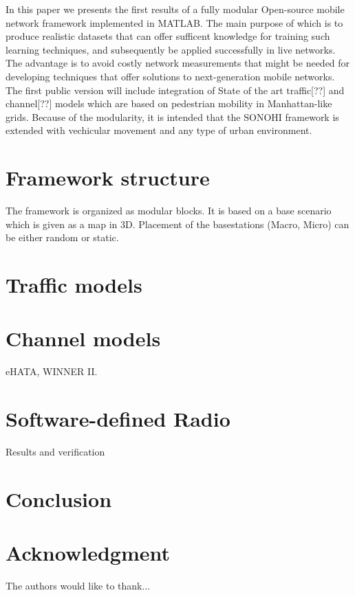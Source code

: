 \documentclass[conference]{IEEEtran}
\begin{document}
In this paper we presents the first results of a fully modular Open-source mobile network framework implemented in MATLAB. The main purpose of which is to produce realistic datasets that can offer sufficent knowledge for training such learning techniques, and subsequently be applied successfully in live networks. The advantage is to avoid costly network measurements that might be needed for developing techniques that offer solutions to next-generation mobile networks. The first public version will include integration of State of the art traffic[??] and channel[??] models which are based on pedestrian mobility in Manhattan-like grids.  Because of the modularity, it is intended that the SONOHI framework is extended with vechicular movement and any type of urban environment.

\section{Framework structure}
The framework is organized as modular blocks. It is based on a base scenario which is given as a map in 3D. Placement of the basestations (Macro, Micro) can be either random or static.

\section{Traffic models}

\section{Channel models}
eHATA, WINNER II.

\section{Software-defined Radio}
Results and verification

\section{Conclusion}






\section*{Acknowledgment}


The authors would like to thank...
\end{document}
